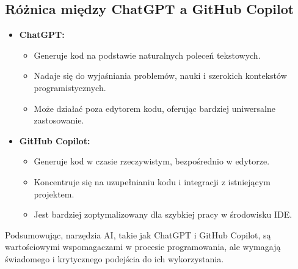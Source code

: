 \subsection{Różnica między ChatGPT a GitHub Copilot}

\begin{itemize}
  \item \textbf{ChatGPT:}
        \begin{itemize}
          \item Generuje kod na podstawie naturalnych poleceń tekstowych.
          \item Nadaje się do wyjaśniania problemów, nauki i szerokich kontekstów programistycznych.
          \item Może działać poza edytorem kodu, oferując bardziej uniwersalne zastosowanie.
        \end{itemize}
  \item \textbf{GitHub Copilot:}
        \begin{itemize}
          \item Generuje kod w czasie rzeczywistym, bezpośrednio w edytorze.
          \item Koncentruje się na uzupełnianiu kodu i integracji z istniejącym projektem.
          \item Jest bardziej zoptymalizowany dla szybkiej pracy w środowisku IDE.
        \end{itemize}
\end{itemize}

Podsumowując, narzędzia AI, takie jak ChatGPT i GitHub Copilot, są wartościowymi wspomagaczami w procesie programowania, ale wymagają świadomego i krytycznego podejścia do ich wykorzystania.

\nocite{ChatGPT}
\nocite{MicrosoftExcel}
